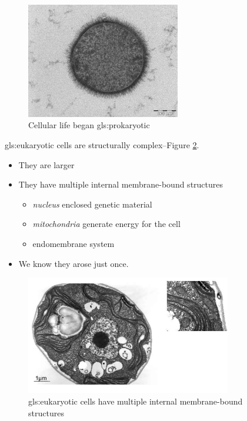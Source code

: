 \documentclass[]{article}
\begin{document}
\begin{figure}[H]
	\begin{center}
		\caption{Cellular life began \gls{gls:prokaryotic}}\label{fig:prokaryote}
		\includegraphics[width=0.6\textwidth]{prokaryote}
	\end{center}
\end{figure}

\Gls{gls:eukaryotic} cells are structurally complex--Figure \ref{fig:ManyMembranes}. 

\begin{itemize}
	\item They are larger
	\item They have multiple internal membrane-bound structures
	\begin{itemize}
		\item \emph{nucleus} enclosed genetic material
		\item \emph{mitochondria} generate energy for the cell
		\item endomembrane system
	\end{itemize}
	\item We know they arose just once.
\end{itemize}

\begin{figure}[H]
	\caption[\Gls{gls:eukaryotic} cells: multiple internal membrane-bound structures]{\Gls{gls:eukaryotic} cells have multiple internal membrane-bound structures}\label{fig:ManyMembranes}
	\includegraphics[width=0.8\textwidth]{ManyMembranes}
\end{figure}
\end{document}
